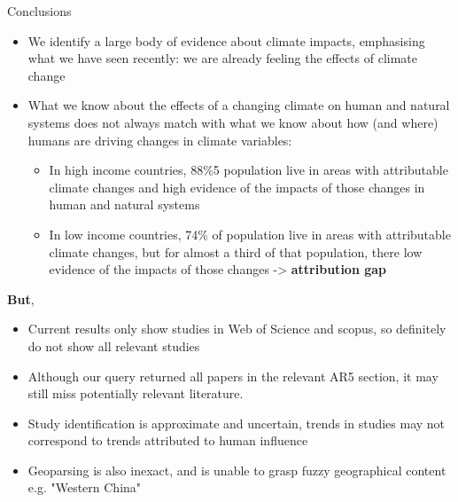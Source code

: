 \documentclass[9pt]{beamer}
\begin{document}
\begin{frame}{Conclusions}

\begin{itemize}
	\item We identify a large body of evidence about climate impacts, emphasising what we have seen recently: we are already feeling the effects of climate change
	\item What we know about the effects of a changing climate on human and natural systems does not always match with what we know about how (and where) humans are driving changes in climate variables:
	\begin{itemize}
		\item In high income countries, 88\%5 population live in areas with attributable climate changes and high evidence of the impacts of those changes in human and natural systems
		\item In low income countries, 74\% of population live in areas with attributable climate changes, but for almost a third of that population, there low evidence of the impacts of those changes -> \textbf{attribution gap}
	\end{itemize}
\end{itemize}

\textbf{But}, 

\begin{itemize}
	\item Current results only show studies in Web of Science and scopus, so definitely do not show all relevant studies
	\item Although our query returned all papers in the relevant AR5 section, it may still miss potentially relevant literature.
	\item Study identification is approximate and uncertain, trends in studies may not correspond to trends attributed to human influence
	\item Geoparsing is also inexact, and is unable to grasp fuzzy geographical content e.g. "Western China"
\end{itemize}

\end{frame}
\end{document}
